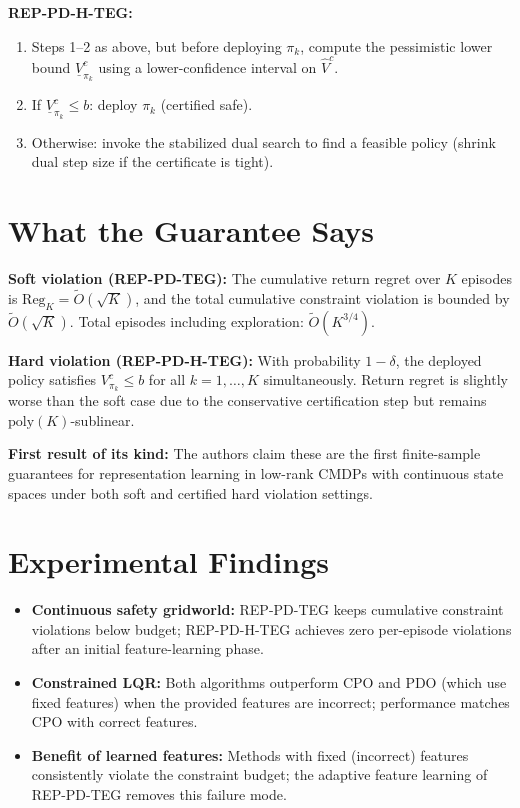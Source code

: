 \documentclass[10pt,twocolumn]{article}
\begin{document}
\textbf{REP-PD-H-TEG:}
\begin{enumerate}[itemsep=2pt,parsep=0pt]
  \item Steps 1--2 as above, but before deploying $\pi_k$, compute the
    pessimistic lower bound $\underline{V}^c_{\pi_k}$ using a lower-confidence
    interval on $\hat{V}^c$.
  \item If $\underline{V}^c_{\pi_k} \leq b$: deploy $\pi_k$ (certified safe).
  \item Otherwise: invoke the stabilized dual search to find a feasible policy
    (shrink dual step size if the certificate is tight).
\end{enumerate}

\section{What the Guarantee Says}

\textbf{Soft violation (REP-PD-TEG):}
The cumulative return regret over $K$ episodes is $\text{Reg}_K = \tilde{O}(\sqrt{K})$,
and the total cumulative constraint violation is bounded by $\tilde{O}(\sqrt{K})$.
Total episodes including exploration: $\tilde{O}(K^{3/4})$.

\textbf{Hard violation (REP-PD-H-TEG):}
With probability $1-\delta$, the deployed policy satisfies $V^c_{\pi_k} \leq b$
for all $k = 1, \ldots, K$ simultaneously. Return regret is slightly worse than
the soft case due to the conservative certification step but remains
$\text{poly}(K)$-sublinear.

\textbf{First result of its kind:}
The authors claim these are the first finite-sample guarantees for
representation learning in low-rank CMDPs with continuous state spaces
under both soft and certified hard violation settings.

\section{Experimental Findings}

\begin{itemize}[itemsep=2pt,parsep=0pt]
  \item \textbf{Continuous safety gridworld:} REP-PD-TEG keeps cumulative
    constraint violations below budget; REP-PD-H-TEG achieves zero per-episode
    violations after an initial feature-learning phase.
  \item \textbf{Constrained LQR:} Both algorithms outperform CPO and PDO
    (which use fixed features) when the provided features are incorrect;
    performance matches CPO with correct features.
  \item \textbf{Benefit of learned features:} Methods with fixed (incorrect)
    features consistently violate the constraint budget; the adaptive feature
    learning of REP-PD-TEG removes this failure mode.
\end{itemize}
\end{document}
